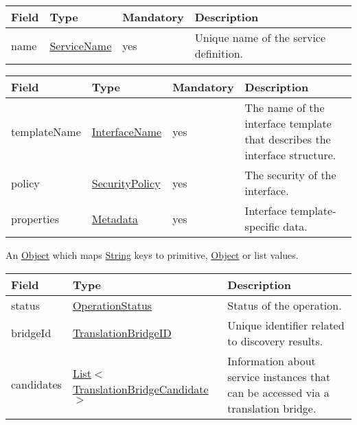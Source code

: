 \documentclass[a4paper]{arrowhead}
\newcommand{\pref}[1]{{\textcolor{ArrowheadGrey}{\hyperref[sec:model:primitives:#1]{#1}}}}
\begin{document}
\begin{table}[ht!]
\begin{tabularx}{\textwidth}{| p{3.9cm} | p{4cm} | p{2cm} | X |} \hline
\rowcolor{gray!33} Field & Type & Mandatory & Description \\ \hline
name & \pref{ServiceName} & yes & Unique name of the service definition. \\ \hline
\end{tabularx}
\end{table}


\begin{table}[ht!]
\begin{tabularx}{\textwidth}{| p{3.9cm} | p{4cm} | p{2cm} | X |} \hline
\rowcolor{gray!33} Field & Type & Mandatory & Description \\ \hline
templateName & \pref{InterfaceName} & yes & The name of the interface template that describes the interface structure. \\ \hline
policy & \pref{SecurityPolicy} & yes & The security of the interface. \\ \hline
properties &\hyperref[sec:model:Metadata]{Metadata} & yes & Interface template-specific data. \\ \hline
\end{tabularx}
\end{table}


An \pref{Object} which maps \pref{String} keys to primitive, \pref{Object} or list values.


\begin{table}[ht!]
\begin{tabularx}{\textwidth}{| p{4.25cm} | p{6.1cm} | X |} \hline
\rowcolor{gray!33} Field & Type      & Description \\ \hline
status & \pref{OperationStatus} & Status of the operation. \\ \hline
bridgeId & \pref{TranslationBridgeID} & Unique identifier related to discovery results. \\ \hline
candidates & \pref{List}$<$\hyperref[sec:model:TranslationBridgeCandidate]{TranslationBridgeCandidate}$>$ & Information about service instances that can be accessed via a translation bridge. \\ \hline
\end{tabularx}
\end{table}
\end{document}
